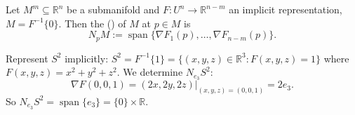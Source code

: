 \begin{definition}
\label{def:normal_space}
Let $M^m \subseteq \mathbb{R}^n$ be a submanifold and $F : U^n \to \mathbb{R}^{n-m}$ an implicit
representation, $M = F^{-1}\{0\}$. Then the  () of
$M$ at $p \in M$ is
\[N_pM := \operatorname{span}\{\nabla F_1(p),\dots,\nabla F_{n-m}(p)\}.\]
\end{definition}

\begin{example}
Represent $S^2$ implicitly: $S^2 = F^{-1}\{1\} = \{(x,y,z)\in\mathbb{R}^3 : F(x,y,z)=1\}$ where
$F(x,y,z) = x^2+y^2+z^2$. We determine $N_{e_3}S^2$:
\[\nabla F(0,0,1) = (2x,2y,2z)\big|_{(x,y,z)=(0,0,1)} = 2e_3.\]
So $N_{e_3}S^2 = \operatorname{span}\{e_3\} = \{0\}\times\mathbb{R}$.
\end{example}

